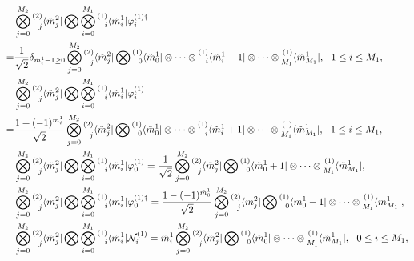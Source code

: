 \documentclass[10pt,a4paper]{amsart}
\begin{document}
	\begin{align}
		&\bigotimes_{j=0}^{M_{2}}\prescript{(2)}{j}{\langle \tilde{m}^{2}_j|}\bigotimes
		\bigotimes_{i=0}^{M_{1}}\prescript{(1)}{i}{\langle \tilde{m}^{1}_i|}
		\varphi_i^{(1)\dagger}\notag\\
		=&\frac{1}{\sqrt{2}}  \delta_{\tilde{m}^{1}_i -1 \geq0}
		\bigotimes\limits_{j=0}^{M_{2}}\prescript{(2)}{j}{\langle \tilde{m}^{2}_j|}\bigotimes	
		\prescript{(1)}{0}{\langle \tilde{m}^{1}_0|}\otimes\cdots\otimes
		\prescript{(1)}{i}{\langle \tilde{m}^{1}_{i}-1|}
		\otimes\cdots\otimes\prescript{(1)}{M_1}{\langle \tilde{m}^{1}_{M_1}|},~~1\leq i\leq M_1,\label{left-ym}\\
		&\bigotimes_{j=0}^{M_{2}}\prescript{(2)}{j}{\langle \tilde{m}^{2}_j|}\bigotimes
		\bigotimes_{i=0}^{M_{1}}\prescript{(1)}{i}{\langle \tilde{m}^{1}_i|}
		\varphi_i^{(1)}\notag\\
		=&	\frac{1 + (-1)^{\tilde{m}_i^{1}}}{\sqrt{2}}
		\bigotimes\limits_{j=0}^{M_{2}}\prescript{(2)}{j}{\langle \tilde{m}^{2}_j|}\bigotimes	
		\prescript{(1)}{0}{\langle \tilde{m}^{1}_0|}\otimes\cdots\otimes
		\prescript{(1)}{i}{\langle \tilde{m}^{1}_{i}+1|}
		\otimes\cdots\otimes\prescript{(1)}{M_1}{\langle \tilde{m}^{1}_{M_1}|},~~1\leq i\leq M_1,\label{left-sc}\\
		&\bigotimes_{j=0}^{M_{2}}\prescript{(2)}{j}{\langle \tilde{m}^{2}_j|}\bigotimes
		\bigotimes_{i=0}^{M_{1}}\prescript{(1)}{i}{\langle \tilde{m}^{1}_i|}
		\varphi_0^{(1)}
		=\frac{1}{\sqrt{2}}
		\bigotimes\limits_{j=0}^{M_{2}}\prescript{(2)}{j}{\langle \tilde{m}^{2}_j|}\bigotimes
		\prescript{(1)}{0}{\langle \tilde{m}^{1}_0 +1|}\otimes\cdots\otimes\prescript{(1)}{M_1}{\langle \tilde{m}^{1}_{M_1}|},\label{left-sc0} \\
		&\bigotimes_{j=0}^{M_{2}}\prescript{(2)}{j}{\langle \tilde{m}^{2}_j|}\bigotimes
		\bigotimes_{i=0}^{M_{1}}\prescript{(1)}{i}{\langle \tilde{m}^{1}_i|}
		\varphi_0^{(1)\dagger}
		=	\frac{1 - (-1)^{\tilde{m}_0^{1}}}{\sqrt{2}}
		\bigotimes\limits_{j=0}^{M_{2}}\prescript{(2)}{j}{\langle \tilde{m}^{2}_j|}\bigotimes
		\prescript{(1)}{0}{\langle \tilde{m}^{1}_0 -1|}\otimes\cdots\otimes\prescript{(1)}{M_1}{\langle \tilde{m}^{1}_{M_1}|},\label{left-ym0}\\
		&\bigotimes_{j=0}^{M_{2}}\prescript{(2)}{j}{\langle \tilde{m}^{2}_j|}\bigotimes
		\bigotimes_{i=0}^{M_{1}}\prescript{(1)}{i}{\langle \tilde{m}^{1}_i|}
		\mathcal{N}_i^{(1)}
		=\tilde{m}^{1}_i
		\bigotimes\limits_{j=0}^{M_{2}}\prescript{(2)}{j}{\langle \tilde{m}^{2}_j|}\bigotimes
		\prescript{(1)}{0}{\langle \tilde{m}^{1}_0|}\otimes\cdots\otimes\prescript{(1)}{M_1}{\langle \tilde{m}^{1}_{M_1}|},~~ 0\leq i\leq M_1,\label{left-eigenvalue}
	\end{align}
\end{document}
